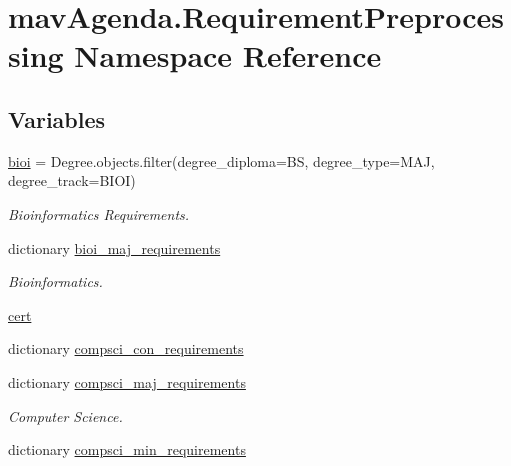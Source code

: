 \hypertarget{namespacemavAgenda_1_1RequirementPreprocessing}{}\section{mav\+Agenda.\+Requirement\+Preprocessing Namespace Reference}
\label{namespacemavAgenda_1_1RequirementPreprocessing}
\subsection*{Variables}
\begin{DoxyCompactItemize}
\item 
\mbox{\hyperlink{namespacemavAgenda_1_1RequirementPreprocessing_a824c0ea7215b8ff5c2ae2b4aa7d368df}{bioi}} = Degree.\+objects.\+filter(degree\+\_\+diploma=\textquotesingle{}BS\textquotesingle{}, degree\+\_\+type=\textquotesingle{}M\+AJ\textquotesingle{}, degree\+\_\+track=\textquotesingle{}B\+I\+OI\textquotesingle{})
\begin{DoxyCompactList}\small\item\em Bioinformatics Requirements. \end{DoxyCompactList}\item 
dictionary \mbox{\hyperlink{namespacemavAgenda_1_1RequirementPreprocessing_a2a45381406f868362d36391ee1698d2f}{bioi\+\_\+maj\+\_\+requirements}}
\begin{DoxyCompactList}\small\item\em Bioinformatics. \end{DoxyCompactList}\item 
\mbox{\hyperlink{namespacemavAgenda_1_1RequirementPreprocessing_afa39381ac882387b6ad6329eed4ef3f1}{cert}}
\item 
dictionary \mbox{\hyperlink{namespacemavAgenda_1_1RequirementPreprocessing_a1d35efe669305d75d4f7fb75b546a5f4}{compsci\+\_\+con\+\_\+requirements}}
\item 
dictionary \mbox{\hyperlink{namespacemavAgenda_1_1RequirementPreprocessing_a1c7ad9a1d23fb567c61aa4db3c9166df}{compsci\+\_\+maj\+\_\+requirements}}
\begin{DoxyCompactList}\small\item\em Computer Science. \end{DoxyCompactList}\item 
dictionary \mbox{\hyperlink{namespacemavAgenda_1_1RequirementPreprocessing_a9d9ed0140986f282669121f70be9708e}{compsci\+\_\+min\+\_\+requirements}}
\item 

\end{DoxyCompactItemize}
